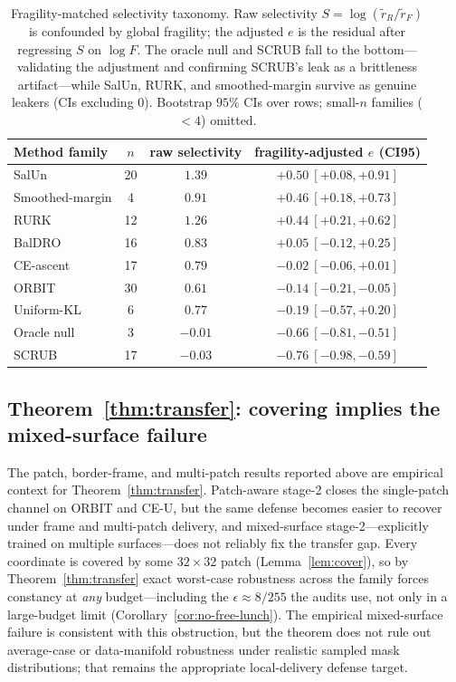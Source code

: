 \documentclass[11pt]{article}
\begin{document}
\begin{table}[t]
  \centering
  \small
  \setlength{\tabcolsep}{6pt}
  \begin{tabular}{l c c c}
    \toprule
    Method family & $n$ & raw selectivity & fragility-adjusted $e$ (CI95) \\
    \midrule
    SalUn            & 20 & $1.39$ & $+0.50\ [+0.08,+0.91]$ \\
    Smoothed-margin  &  4 & $0.91$ & $+0.46\ [+0.18,+0.73]$ \\
    RURK             & 12 & $1.26$ & $+0.44\ [+0.21,+0.62]$ \\
    BalDRO           & 16 & $0.83$ & $+0.05\ [-0.12,+0.25]$ \\
    CE-ascent        & 17 & $0.79$ & $-0.02\ [-0.06,+0.01]$ \\
    ORBIT            & 30 & $0.61$ & $-0.14\ [-0.21,-0.05]$ \\
    Uniform-KL       &  6 & $0.77$ & $-0.19\ [-0.57,+0.20]$ \\
    Oracle null      &  3 & $-0.01$ & $-0.66\ [-0.81,-0.51]$ \\
    SCRUB            & 17 & $-0.03$ & $-0.76\ [-0.98,-0.59]$ \\
    \bottomrule
  \end{tabular}
  \caption{Fragility-matched selectivity taxonomy. Raw selectivity $S=\log(\tilde r_R/\tilde r_F)$ is confounded by global fragility; the adjusted $e$ is the residual after regressing $S$ on $\log F$. The oracle null and SCRUB fall to the bottom---validating the adjustment and confirming SCRUB's leak as a brittleness artifact---while SalUn, RURK, and smoothed-margin survive as genuine leakers (CIs excluding $0$). Bootstrap $95\%$ CIs over rows; small-$n$ families ($<4$) omitted.}
  \label{tab:adj-selectivity}
\end{table}

\subsection{Theorem~\ref{thm:transfer}: covering implies the mixed-surface failure}
The patch, border-frame, and multi-patch results reported above are empirical context for Theorem~\ref{thm:transfer}. Patch-aware stage-2 closes the single-patch channel on ORBIT and CE-U, but the same defense becomes easier to recover under frame and multi-patch delivery, and mixed-surface stage-2---explicitly trained on multiple surfaces---does not reliably fix the transfer gap. Every coordinate is covered by some $32\times 32$ patch (Lemma~\ref{lem:cover}), so by Theorem~\ref{thm:transfer} exact worst-case robustness across the family forces constancy at \emph{any} budget---including the $\epsilon \approx 8/255$ the audits use, not only in a large-budget limit (Corollary~\ref{cor:no-free-lunch}). The empirical mixed-surface failure is consistent with this obstruction, but the theorem does not rule out average-case or data-manifold robustness under realistic sampled mask distributions; that remains the appropriate local-delivery defense target.
\end{document}
